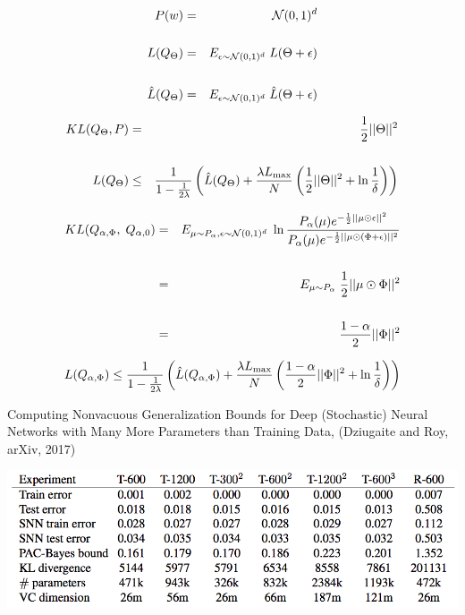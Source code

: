 {\vfill
\begin{eqnarray*}
P(w) & = & {\cal N}(0,1)^d \\
  \\
L(Q_\Theta) & = & E_{\epsilon \sim {\cal N}(0,1)^d}\;L(\Theta+\epsilon) \\
\\
\hat{L}(Q_\Theta) & = & E_{\epsilon \sim {\cal N}(0,1)^d}\;\hat{L}(\Theta+\epsilon)
\end{eqnarray*}

\vfill
\begin{eqnarray*}
  KL(Q_\Theta,P) & = & \frac{1}{2}||\Theta||^2 \\
  \\
  L(Q_\Theta) & \leq & \frac{1}{1-\frac{1}{2\lambda}}\left(\hat{L}(Q_\Theta) + \frac{\lambda L_{\max}}{N}\left(\frac{1}{2}||\Theta||^2 + \ln \frac{1}{\delta}\right)\right)
\end{eqnarray*}


\begin{eqnarray*}
KL(Q_{\alpha,\Phi},\;Q_{\alpha,0}) & = & E_{\mu \sim P_\alpha, \epsilon \sim {\cal N}(0,1)^d}\;\ln \frac{P_\alpha(\mu) e^{-\frac{1}{2}||\mu \odot \epsilon||^2}}{P_\alpha(\mu) e^{-\frac{1}{2}||\mu \odot (\Phi + \epsilon)||^2}} \\
\\
& = & E_{\mu \sim P_\alpha}\;\frac{1}{2}||\mu \odot \Phi||^2 \\
\\
& = & \frac{1-\alpha}{2}||\Phi||^2
\end{eqnarray*}

$$L(Q_{\alpha,\Phi}) \leq \frac{1}{1-\frac{1}{2\lambda}}\left(\hat{L}(Q_{\alpha,\Phi}) + \frac{\lambda L_{\max}}{N}\left(\frac{1-\alpha}{2}||\Phi||^2 + \ln \frac{1}{\delta}\right)\right)$$


Computing Nonvacuous Generalization Bounds for Deep (Stochastic) Neural Networks with Many More Parameters than Training Data, (Dziugaite and Roy, arXiv, 2017)

\vfill
\centerline{\includegraphics[width = 8in]{../images/Roy}}

}
